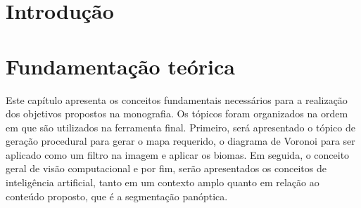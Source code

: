 \documentclass[
	12pt,				%
	openright,			%
	twoside,			%
	a4paper,			%
	english,			%
	french,				%
	spanish,			%
	brazil				%
	]{abntex2}
\begin{document}
\tableofcontents*
\cleardoublepage



\textual

\chapter{Introdução}



\chapter{Fundamentação teórica}

Este capítulo apresenta os conceitos fundamentais necessários para a realização dos objetivos propostos na monografia. Os tópicos foram organizados na ordem em que são utilizados na ferramenta final. Primeiro, será apresentado o tópico de geração procedural para gerar o mapa requerido, o diagrama de Voronoi para ser aplicado como um filtro na imagem e aplicar os biomas. Em seguida, o conceito geral de visão computacional e por fim, serão apresentados os conceitos de inteligência artificial, tanto em um contexto amplo quanto em relação ao conteúdo proposto, que é a segmentação panóptica.






















\end{document}
